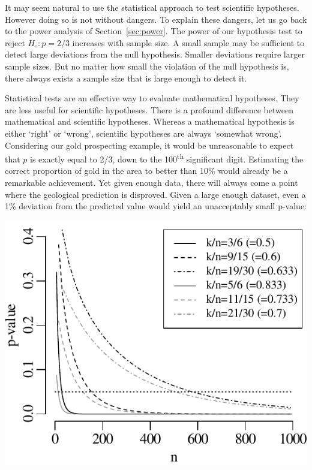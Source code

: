 It may seem natural to use the statistical approach to test scientific
hypotheses. However doing so is not without dangers. To explain these
dangers, let us go back to the power analysis of
Section~\ref{sec:power}. The power of our hypothesis test to reject
$H_\circ: p=2/3$ increases with sample size. A small sample may be
sufficient to detect large deviations from the null
hypothesis. Smaller deviations require larger sample sizes. But no
matter how small the violation of the null hypothesis is, there always
exists a sample size that is large enough to detect it.\medskip

Statistical tests are an effective way to evaluate mathematical
hypotheses. They are less useful for scientific hypotheses.  There is
a profound difference between mathematical and scientific
hypotheses. Whereas a mathematical hypothesis is either `right' or
`wrong', scientific hypotheses are always `somewhat wrong'.
Considering our gold prospecting example, it would be unreasonable to
expect that $p$ is exactly equal to 2/3, down to the
100\textsuperscript{th} significant digit.  Estimating the correct
proportion of gold in the area to better than 10\% would already be a
remarkable achievement. Yet given enough data, there will always come
a point where the geological prediction is disproved. Given a large
enough dataset, even a 1\% deviation from the predicted value would
yield an unacceptably small p-value:

\noindent\begin{minipage}[t][][b]{.45\textwidth}
  \includegraphics[width=\textwidth]{../figures/binompvsn.pdf}
\end{minipage}
\begin{minipage}[t][][t]{.55\textwidth}
  \label{fig:binomnvsp}
\end{minipage}


